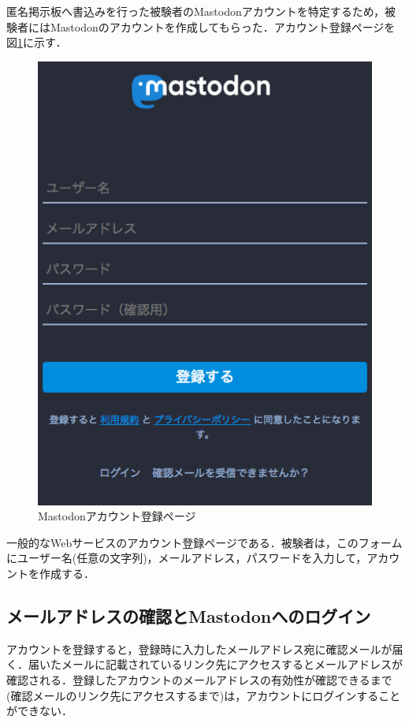 \documentclass[10pt, a4paper]{jreport}
\begin{document}
匿名掲示板へ書込みを行った被験者のMastodonアカウントを特定するため，被験者にはMastodonのアカウントを作成してもらった．アカウント登録ページを図\ref{fig: account_registration}に示す．

\begin{figure}[H]
	\begin{center}
		\includegraphics[width=130mm]{figures/account_registration_screenshot.png}
	\end{center}
	\caption{Mastodonアカウント登録ページ}
	\label{fig: account_registration}
\end{figure}

一般的なWebサービスのアカウント登録ページである．被験者は，このフォームにユーザー名(任意の文字列)，メールアドレス，パスワードを入力して，アカウントを作成する．

\subsection{メールアドレスの確認とMastodonへのログイン}
アカウントを登録すると，登録時に入力したメールアドレス宛に確認メールが届く．届いたメールに記載されているリンク先にアクセスするとメールアドレスが確認される．登録したアカウントのメールアドレスの有効性が確認できるまで(確認メールのリンク先にアクセスするまで)は，アカウントにログインすることができない．
\end{document}
